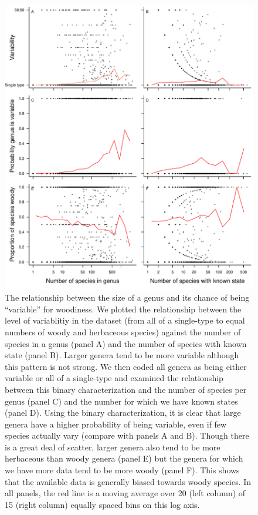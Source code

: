 \begin{figure}[p]
  \centering
  \includegraphics[width=.8\textwidth]{figs/variability}
  \caption[Relationship between genus size and proportion of
  woodiness]{The relationship between the size of a genus and its
    chance of being ``variable'' for woodiness.
%
We plotted the relationship between the level of variablitiy in the
dataset (from all of a single-type to equal numbers of woody and
herbaceous species) against the number of species in a genus (panel A)
and the number of species with known state (panel B). Larger genera
tend to be more variable although this pattern is not strong. We then
coded all genera as being either variable or all of a single-type and
examined the relationship between this binary characterization and the
number of species per genus (panel C) and the number for which we
have known states (panel D). Using the binary characterization, it is
clear that large genera have a higher probability of being variable,
even if few species actually vary (compare with panels A and
B). Though there is a great deal of scatter, larger genera also tend to be
more herbaceous than woody genera (panel E) but the genera for which
we have more data tend to be more woody (panel F). This shows that the
available data is generally biased towards woody species.  In all
panels, the red line is a moving average over 20 (left column) of 15 (right
column) equally spaced bins on this log axis.}
  \label{fig:variability}
\end{figure}

